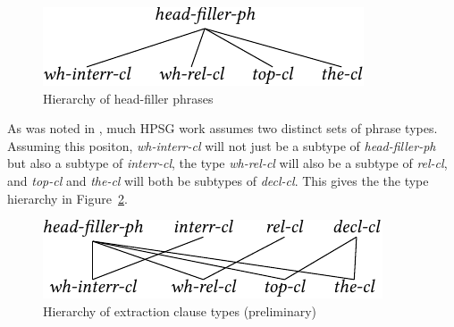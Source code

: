 \documentclass[output=paper
	        ,collection
	        ,collectionchapter
 	        ,biblatex
                ,babelshorthands
                ,newtxmath
                ,draftmode
                ,colorlinks, citecolor=brown
]{langscibook}
\begin{document}
{\begin{figure}[htb]
  \includegraphics{figures/BB-head-fill-hier-crop}
  \caption{\label{fig:UDC:48}Hierarchy of head-filler phrases}
  
\end{figure}


As was noted in , much HPSG work assumes two distinct sets of
phrase types. Assuming this positon, \emph{wh-interr-cl} will not just
be a subtype of \emph{head-filler-ph} but also a subtype of
\emph{interr-cl}, the type \emph{wh-rel-cl} will also be a subtype of
\emph{rel-cl}, and \emph{top-cl} and \emph{the-cl} will both be subtypes
of \emph{decl-cl}. This gives the the type hierarchy in Figure~\ref{fig:UDC:49}.

\begin{figure}[htb]
  \centering

  \includegraphics{figures/BB-extraction-function-hier-crop}
  \caption{\label{fig:UDC:49}Hierarchy of extraction clause types (preliminary)}
  
\end{figure}


}
\end{document}
